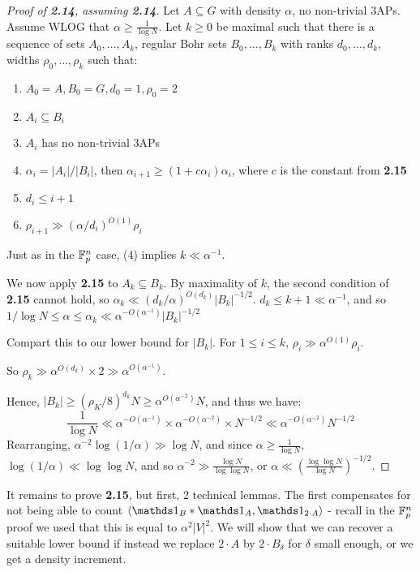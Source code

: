 \documentclass[10pt,a4paper]{article}
\begin{document}
\begin{proof}[Proof of \textbf{2.14}, assuming \textbf{2.14}]
  Let $A \subseteq G$ with density $\alpha$, no non-trivial 3APs. Assume WLOG that $\alpha \geq \frac{1}{\log N}$. Let $k \geq 0$ be maximal such that there is a sequence of sets $A_0, \ldots, A_k$, regular Bohr sets $B_0, \ldots, B_k$ with ranks $d_0, \ldots, d_k$, widths $\rho_0, \ldots, \rho_k$ such that:
  \begin{enumerate}
    \item $A_0 = A, B_0 = G, d_0 = 1, \rho_0 = 2$
    \item $A_i \subseteq B_i$
    \item $A_i$ has no non-trivial 3APs
    \item $\alpha_i = |A_i|/|B_i|$, then $\alpha_{i+1} \geq (1+c\alpha_i)\alpha_i$, where $c$ is the constant from \textbf{2.15}
    \item $d_i \leq i+1$
    \item $\rho_{i+1} \gg (\alpha/d_i)^{O(1)}\rho_i$
  \end{enumerate}
  Just as in the $\mathbb{F}_p^n$ case, (4) implies $k \ll \alpha^{-1}$.

  We now apply \textbf{2.15} to $A_k \subseteq B_k$. By maximality of $k$, the second condition of \textbf{2.15} cannot hold, so $\alpha_k \ll (d_k/\alpha)^{O(d_k)}|B_k|^{-1/2}$. $d_k \leq k+1 \ll \alpha^{-1}$, and so $1/\log N \leq \alpha \leq \alpha_k \ll \alpha^{-O(\alpha^{-1})}|B_k|^{-1/2}$

  Compart this to our lower bound for $|B_k|$. For $1 \leq i \leq k$, $\rho_i \gg \alpha^{O(1)} \rho_i$.

  So $\rho_k \gg \alpha^{O(d_k)}\times 2 \gg \alpha^{O(\alpha^{-1})}$.

  Hence, $|B_k| \geq (\rho_K/8)^{d_k}N \geq \alpha^{O(\alpha^{-2})}N$, and thus we have:
  \[\frac{1}{\log N} \ll \alpha^{-O(\alpha^{-1})} \times \alpha^{-O(\alpha^{-2})} \times N^{-1/2} \ll \alpha^{-O(\alpha^{-2})}N^{-1/2}\]
  Rearranging, $\alpha^{-2}\log(1/\alpha) \gg \log N$, and since $\alpha \geq \frac{1}{\log N}$, $\log(1/\alpha) \ll \log\log N$, and so $\alpha^{-2} \gg \frac{\log N}{\log\log N}$, or $\alpha \ll \left(\frac{\log\log N}{\log N}\right)^{-1/2}$.
\end{proof}
It remains to prove \textbf{2.15}, but first, 2 technical lemmas. The first compensates for not being able to count $\angle{\one_B \ast \one_A, \one_{2\cdot A}}$ - recall in the $\mathbb{F}_p^n$ proof we used that this is equal to $\alpha^2 |V|^2$. We will show that we can recover a suitable lower bound if instead we replace $2\cdot A$ by $2 \cdot B_{\delta}$ for $\delta$ small enough, or we get a density increment.
\end{document}
